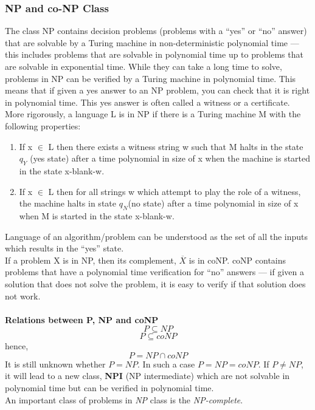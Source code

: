 \subsubsection{NP and co-NP Class}
The class NP contains decision problems (problems with a \enquote{yes} or \enquote{no} answer) that are solvable by a Turing machine in non-deterministic polynomial time — this includes problems that are solvable in polynomial time up to problems that are solvable in exponential time. While they can take a long time to solve, problems in NP can be verified by a Turing machine in polynomial time. This means that if given a yes answer to an NP problem, you can check that it is right in polynomial time. This yes answer is often called a witness or a certificate.\\
More rigorously, a language L is in NP if there is a Turing machine M with the following properties:
\begin{enumerate}
\item If x $\in$ L then there exists a witness string w such that M halts in the state $q_Y$ (yes state) after a time polynomial in size of x when the machine is started in the state x-blank-w.
\item If x $\in$ L then for all strings w which attempt to play the role of a witness, the
machine halts in state $q_N$(no state) after a time polynomial in size of x when M is started in the state x-blank-w.
\end{enumerate}
Language of an algorithm/problem can be understood as the set of all the inputs which results in the \enquote{yes} state.\\
If a problem X is in NP, then its complement, $\overline{X}$ is in coNP. coNP contains problems that have a polynomial time verification for \enquote{no} answers — if given a solution that does not solve the problem, it is easy to verify if that solution does not work.\\\\
{\bf Relations between P, NP and coNP}\\
\[ P \subseteq NP \]
\[ P \subseteq coNP \]
hence, \[ P=NP \cap coNP \]
It is still unknown whether {$P = NP$}. In such a case {$ P=NP=coNP $}. If {$ P \neq NP $}, it will lead to a new class, {\bf NPI } (NP intermediate) which are not solvable in polynomial time but can be verified in polynomial time. \\
An important class of problems in {\it NP} class is the {\it NP-complete}.

